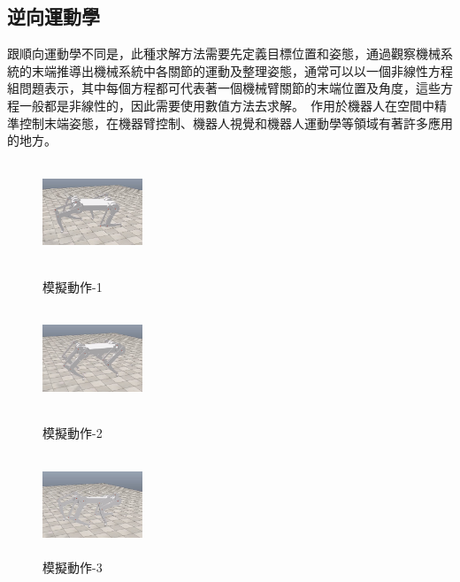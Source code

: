 \subsection{逆向運動學}
跟順向運動學不同是，此種求解方法需要先定義目標位置和姿態，通過觀察機械系統的末端推導出機械系統中各關節的運動及整理姿態，通常可以以一個非線性方程組問題表示，其中每個方程都可代表著一個機械臂關節的末端位置及角度，這些方程一般都是非線性的，因此需要使用數值方法去求解。\
作用於機器人在空間中精準控制末端姿態，在機器臂控制、機器人視覺和機器人運動學等領域有著許多應用的地方。\\
\begin{figure}[htbp]
  \begin{minipage}[t]{0.3\linewidth}
    \centering
    \includegraphics[height=3cm,width=3cm]{模擬動作-1}
    \caption{模擬動作-1}
    \label{模擬動作-1}
  \end{minipage}
  \hfill
  \begin{minipage}[t]{0.3\linewidth}
    \centering
    \includegraphics[height=3cm,width=3cm]{模擬動作-2}
    \caption{模擬動作-2}
    \label{模擬動作-2}
  \end{minipage}
  \hfill
  \begin{minipage}[t]{0.3\linewidth}
    \centering
    \includegraphics[height=3cm,width=3cm]{模擬動作-3}
    \caption{模擬動作-3}
    \label{模擬動作-3}
  \end{minipage}
\end{figure}

